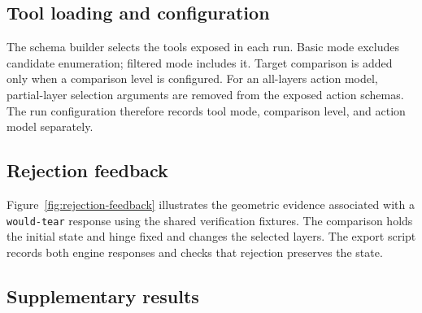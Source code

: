 

\subsection{Tool loading and configuration}
\label{app:tool-loading}
The schema builder selects the tools exposed in each run. Basic mode excludes candidate
enumeration; filtered mode includes it. Target comparison is added only when a comparison level
is configured. For an all-layers action model, partial-layer selection arguments are removed
from the exposed action schemas. The run configuration therefore records tool mode, comparison
level, and action model separately.

\subsection{Rejection feedback}
Figure~\ref{fig:rejection-feedback} illustrates the geometric evidence associated with
a \texttt{would-tear} response using the shared verification fixtures. The comparison
holds the initial state and hinge fixed and changes the selected layers. The export
script records both engine responses and checks that rejection preserves the state.


\subsection{Supplementary results}
\label{app:supplementary-results}

